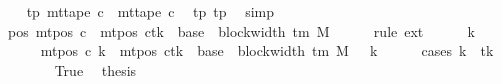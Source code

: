\begin{isabellebody}
\ \ \isamarkupfalse%
\ tp{}{\isacharprime}{\kern0pt}{\isacharcolon}{\kern0pt}\ {\isachardoublequoteopen}mt{\isacharunderscore}{\kern0pt}tape\ c{}\ {\isacharequal}{\kern0pt}\ mt{\isacharunderscore}{\kern0pt}tape\ c{\isacharprime}{\kern0pt}{\isachardoublequoteclose}\ \isamarkupfalse%
\ tp{}\ tp{}{\isacharprime}{\kern0pt}\ \isamarkupfalse%
\ simp\isanewline
\ \ \isamarkupfalse%
\ pos{}{\isacharcolon}{\kern0pt}\ {\isachardoublequoteopen}mt{\isacharunderscore}{\kern0pt}pos\ c{}\ {\isacharequal}{\kern0pt}\ {\isacharparenleft}{\kern0pt}mt{\isacharunderscore}{\kern0pt}pos\ c{\isacharprime}{\kern0pt}{\isacharparenright}{\kern0pt}{\isacharparenleft}{\kern0pt}tk\ {\isacharcolon}{\kern0pt}{\isacharequal}{\kern0pt}\ base\ {\isacharplus}{\kern0pt}\ {\isacharparenleft}{\kern0pt}block{\isacharunderscore}{\kern0pt}width\ {\isacharparenleft}{\kern0pt}{\isasymGamma}{\isacharunderscore}{\kern0pt}tm\ M{\isacharparenright}{\kern0pt}\ {\isacharminus}{\kern0pt}\ {}{\isacharparenright}{\kern0pt}{\isacharparenright}{\kern0pt}{\isachardoublequoteclose}\isanewline
\ \ \isamarkupfalse%
\ {\isacharparenleft}{\kern0pt}rule\ ext{\isacharparenright}{\kern0pt}\isanewline
\ \ \ \ \isamarkupfalse%
\ k{\isacharprime}{\kern0pt}\isanewline
\ \ \ \ \isamarkupfalse%
\ {\isachardoublequoteopen}mt{\isacharunderscore}{\kern0pt}pos\ c{}\ k{\isacharprime}{\kern0pt}\ {\isacharequal}{\kern0pt}\ {\isacharparenleft}{\kern0pt}{\isacharparenleft}{\kern0pt}mt{\isacharunderscore}{\kern0pt}pos\ c{\isacharprime}{\kern0pt}{\isacharparenright}{\kern0pt}{\isacharparenleft}{\kern0pt}tk\ {\isacharcolon}{\kern0pt}{\isacharequal}{\kern0pt}\ base\ {\isacharplus}{\kern0pt}\ {\isacharparenleft}{\kern0pt}block{\isacharunderscore}{\kern0pt}width\ {\isacharparenleft}{\kern0pt}{\isasymGamma}{\isacharunderscore}{\kern0pt}tm\ M{\isacharparenright}{\kern0pt}\ {\isacharminus}{\kern0pt}\ {}{\isacharparenright}{\kern0pt}{\isacharparenright}{\kern0pt}{\isacharparenright}{\kern0pt}\ k{\isacharprime}{\kern0pt}{\isachardoublequoteclose}\isanewline
\ \ \ \ \isamarkupfalse%
\ {\isacharparenleft}{\kern0pt}cases\ {\isachardoublequoteopen}k{\isacharprime}{\kern0pt}\ {\isacharequal}{\kern0pt}\ tk{\isachardoublequoteclose}{\isacharparenright}{\kern0pt}\isanewline
\ \ \ \ \ \ \isamarkupfalse%
\ True\ \isamarkupfalse%
\ {\isacharquery}{\kern0pt}thesis\ \isamarkupfalse%

\end{isabellebody}
